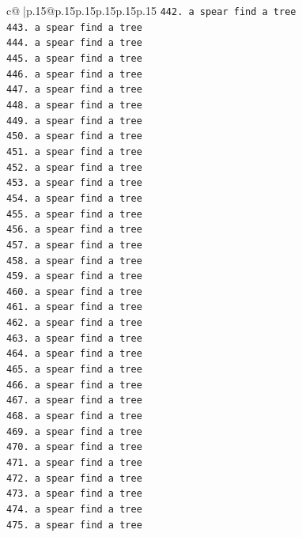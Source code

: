 \documentclass{article}
\begin{document}
{\begin{supertabular}{c@{$\;$}|p{.15\linewidth}@{}p{.15\linewidth}p{.15\linewidth}p{.15\linewidth}p{.15\linewidth}p{.15\linewidth}}
{{{\texttt{442. a spear find a tree} \\
\texttt{443. a spear find a tree} \\
\texttt{444. a spear find a tree} \\
\texttt{445. a spear find a tree} \\
\texttt{446. a spear find a tree} \\
\texttt{447. a spear find a tree} \\
\texttt{448. a spear find a tree} \\
\texttt{449. a spear find a tree} \\
\texttt{450. a spear find a tree} \\
\texttt{451. a spear find a tree} \\
\texttt{452. a spear find a tree} \\
\texttt{453. a spear find a tree} \\
\texttt{454. a spear find a tree} \\
\texttt{455. a spear find a tree} \\
\texttt{456. a spear find a tree} \\
\texttt{457. a spear find a tree} \\
\texttt{458. a spear find a tree} \\
\texttt{459. a spear find a tree} \\
\texttt{460. a spear find a tree} \\
\texttt{461. a spear find a tree} \\
\texttt{462. a spear find a tree} \\
\texttt{463. a spear find a tree} \\
\texttt{464. a spear find a tree} \\
\texttt{465. a spear find a tree} \\
\texttt{466. a spear find a tree} \\
\texttt{467. a spear find a tree} \\
\texttt{468. a spear find a tree} \\
\texttt{469. a spear find a tree} \\
\texttt{470. a spear find a tree} \\
\texttt{471. a spear find a tree} \\
\texttt{472. a spear find a tree} \\
\texttt{473. a spear find a tree} \\
\texttt{474. a spear find a tree} \\
\texttt{475. a spear find a tree} \\
}}}
\end{supertabular}}
\end{document}
